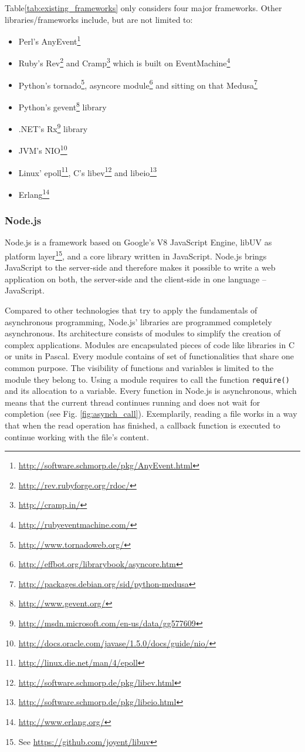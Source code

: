 Table\ref{tab:existing_frameworks} only considers four major frameworks. Other libraries/frameworks include, but are not limited to:

\begin{itemize}
  \item Perl's AnyEvent\footnote{\url{http://software.schmorp.de/pkg/AnyEvent.html}}
  \item Ruby's Rev\footnote{\url{http://rev.rubyforge.org/rdoc/}} and Cramp\footnote{\url{http://cramp.in/}} which is built on EventMachine\footnote{\url{http://rubyeventmachine.com/}}
  \item Python's tornado\footnote{\url{http://www.tornadoweb.org/}}, asyncore module\footnote{\url{http://effbot.org/librarybook/asyncore.htm}} and sitting on that Medusa\footnote{\url{http://packages.debian.org/sid/python-medusa}}
  \item Python's gevent\footnote{\url{http://www.gevent.org/}} library
  \item .NET's Rx\footnote{\url{http://msdn.microsoft.com/en-us/data/gg577609}} library
  \item JVM's NIO\footnote{\url{http://docs.oracle.com/javase/1.5.0/docs/guide/nio/}}
  \item Linux' epoll\footnote{\url{http://linux.die.net/man/4/epoll}}, C's libev\footnote{\url{http://software.schmorp.de/pkg/libev.html}} and libeio\footnote{\url{http://software.schmorp.de/pkg/libeio.html}}
  \item Erlang\footnote{\url{http://www.erlang.org/}}
\end{itemize}

\FloatBarrier

\subsubsection{Node.js}
\label{Node.js}

Node.js is a framework based on Google's V8 JavaScript Engine, libUV as platform
layer\footnote{See \url{https://github.com/joyent/libuv}}, and a core library
written in JavaScript.
Node.js brings JavaScript to the server-side and therefore makes it possible to
write a web application on both, the server-side and the client-side in one
language – JavaScript.

Compared to other technologies that try to apply the fundamentals of
asynchronous programming, Node.js' libraries are programmed completely
asynchronous. Its architecture consists of modules to simplify the creation of
complex applications. Modules are encapsulated pieces of code like libraries in
C or units in Pascal. Every module contains of set of functionalities that share
one common purpose. The visibility of functions and variables is limited to the
module they belong to. Using a module requires to call the function \texttt{require()}
and its allocation to a variable.
Every function in Node.js is asynchronous, which means that the current thread
continues running and does not wait for completion (see Fig.
\ref{fig:asynch_call}). Exemplarily, reading a file works in a way that when the
read operation has finished, a callback function is executed to continue working
with the file's content.

